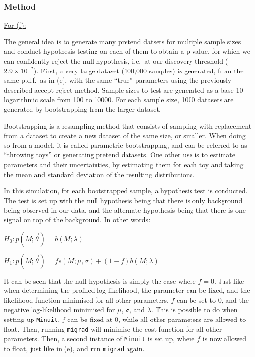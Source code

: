 \documentclass[12pt]{report} %
\begin{document}
\subsubsection*{Method}

\underline{For (f):}  

\vspace*{1\baselineskip}
The general idea is to generate many pretend datsets for multiple sample sizes and conduct hypothesis testing on each of them to obtain a p-value, for which we can confidently reject the null hypothesis, i.e.\ at our discovery threshold ($2.9 \times 10^{-7}$).  
First, a very large dataset (100,000 samples) is generated, from the same p.d.f.\ as in (e), with the same ``true'' parameters using the previously described accept-reject method. Sample sizes to test are generated as a base-10 logarithmic scale from 100 to 10000. For each sample size, 1000 datasets are generated by bootstrapping from the larger dataset.


Bootstrapping is a resampling method that consists of sampling with replacement from a dataset to create a new dataset of the same size, or smaller. When doing so from a model, it is called parametric bootstrapping, and can be referred to as ``throwing toys'' or generating pretend datasets. One other use is to estimate parameters and their uncertainties, by estimating them for each toy and taking the mean and standard deviation of the resulting distributions\cite[p. 108]{Wass}.  

In this simulation, for each bootstrapped sample, a hypothesis test is conducted. The test is set up with the null hypothesis being that there is only background being observed in our data, and the alternate hypothesis being that there is one signal on top of the background. In other words:  

\begin{center}
    $H_{0}: p(M;\vec{\theta}) = b(M;\lambda)$  

    \vspace*{1\baselineskip}  
    $H_{1}: p(M;\vec{\theta}) = fs(M;\mu,\sigma) + (1 - f)b(M;\lambda)$
\end{center}

It can be seen that the null hypothesis is simply the case where $f=0$. Just like when determining the profiled log-likelihood, the parameter can be fixed, and the likelihood function minimised for all other parameters. $f$ can be set to 0, and the negative log-likelihood minimised for $\mu$, $\sigma$, and $\lambda$. This is possible to do when setting up \texttt{Minuit}, $f$ can be fixed at 0, while all other parameters are allowed to float. Then, running \texttt{migrad} will minimise the cost function for all other parameters. Then, a second instance of \texttt{Minuit} is set up, where $f$ is now allowed to float, just like in (e), and run \texttt{migrad} again\cite{iminuitMinuit}\cite{iminuitMigrad}.  
\end{document}
